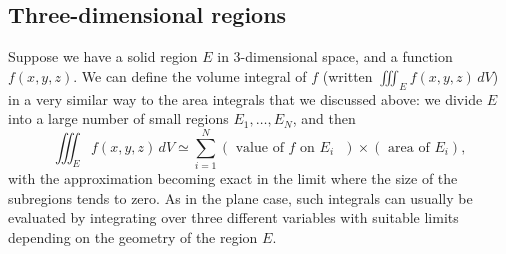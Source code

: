 \documentclass[reqno]{amsart}
\theoremstyle{definition}
\newtheorem{example}[theorem]{Example}
\begin{document}

\subsection{Three-dimensional regions}
\label{subsec-volume-integrals}

Suppose we have a solid region $E$ in $3$-dimensional space, and a
function $f(x,y,z)$.  We can define the volume integral of $f$
(written $\iiint_E f(x,y,z)\,dV$) in a very similar way to the area
integrals that we discussed above: we divide $E$ into a large number
of small regions $E_1,\dotsc,E_N$, and then 
\[ \iiint_E f(x,y,z)\,dV \simeq \sum_{i=1}^N 
    (\text{ value of $f$ on $E_i$ }) \times (\text{ area of } E_i),
\]
with the approximation becoming exact in the limit where the size of
the subregions tends to zero.  As in the plane case, such integrals
can usually be evaluated by integrating over three different variables
with suitable limits depending on the geometry of the region $E$.
\end{document}
